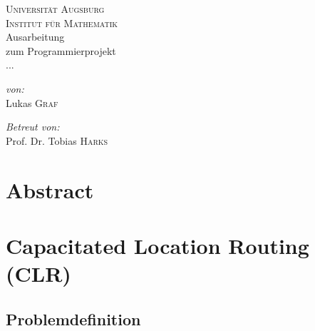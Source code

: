 \documentclass[a4paper,ngerman,12pt,bibtotoc]{scrartcl}
\theoremstyle{definition}
\theoremstyle{plain}
\theoremstyle{remark}
\begin{document}
\author{Lukas Graf}
\date{Letzte Aktualisierung: \today}

\thispagestyle{empty}


\begin{titlepage}\center
	\textsc{\LARGE Universität Augsburg}\\[1.5cm]
	
	\textsc{\Large Institut für Mathematik}\\[2.5cm]
	
	{\Large Ausarbeitung \\[1cm]}
	zum Programmierprojekt\\[1.5cm]
	{\huge ...}

	\begin{center}
	\end{center}		
	
	\vfill
	
	\begin{minipage}{0.4\textwidth}
		\begin{flushleft} \large
			\emph{von:}\\
			Lukas \textsc{Graf}
		\end{flushleft}
	\end{minipage}
	\begin{minipage}{0.4\textwidth}
		\begin{flushright} \large
			\emph{Betreut von:} \\
			Prof. Dr. Tobias \textsc{Harks}
		\end{flushright}
	\end{minipage}
	
\end{titlepage}


	
\section*{\glqq Abstract\grqq}



\section{Capacitated Location Routing (CLR)}

	\subsection{Problemdefinition}
\end{document}
